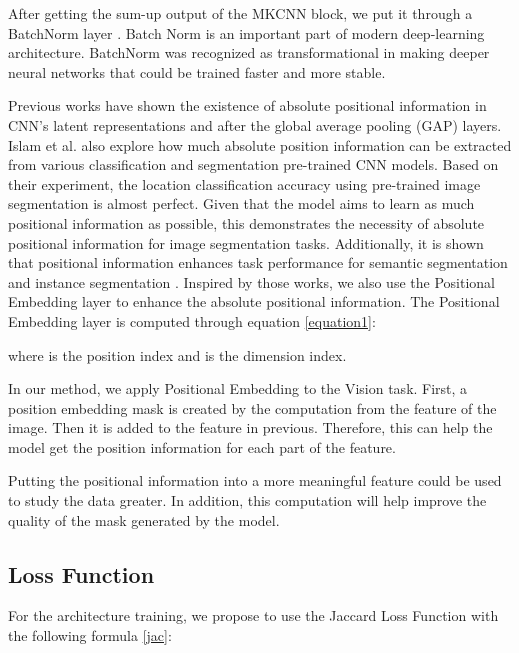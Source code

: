 \documentclass[conference]{IEEEtran}
\begin{document}
\vspace{1mm}

After getting the sum-up output of the MKCNN block, we put it through a BatchNorm layer \cite{batchnorm}. Batch Norm is an important part of modern deep-learning architecture. BatchNorm was recognized as transformational in making deeper neural networks that could be trained faster and more stable.

\vspace{1mm}

Previous works \cite{islam, amirul, semih} have shown the existence of absolute positional information in CNN's latent representations and after the global average pooling (GAP) layers. Islam et al.\cite{amirul} also explore how much absolute position information can be extracted from various classification and segmentation pre-trained CNN models. Based on their experiment, the location classification accuracy using pre-trained image segmentation is almost perfect. Given that the model aims to learn as much positional information as possible, this demonstrates the necessity of absolute positional information for image segmentation tasks. 
Additionally, it is shown that positional information enhances task performance for semantic segmentation and instance segmentation \cite{amirul1}. Inspired by those works, we also use the Positional Embedding layer to enhance the absolute positional information. The Positional Embedding layer is computed through equation \ref{equation1}:
\begin{center}
    
\end{center}
where  is the position index and  is the dimension index. 

In our method, we apply Positional Embedding to the Vision task. First, a position embedding mask is created by the computation from the feature of the image. Then it is added to the feature in previous. Therefore, this can help the model get the position information for each part of the feature. 

Putting the positional information into a more meaningful feature could be used to study the data greater. In addition, this computation will help improve the quality of the mask generated by the model.

\subsection{Loss Function}
For the architecture training, we propose to use the Jaccard Loss Function \cite{jaacaard} with the following formula \ref{jac}: 
\end{document}
